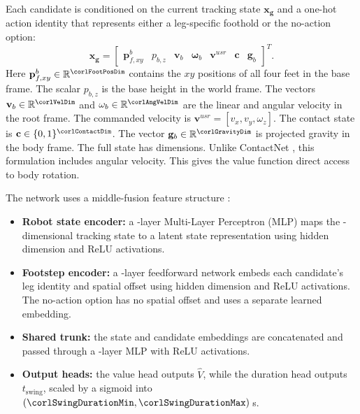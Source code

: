 Each candidate is conditioned on the current tracking state
$\mathbf{x_g}$ and a one-hot action identity that represents either a
leg-specific foothold or the no-action option:
\begin{equation}
  \mathbf{x_g} =
  \begin{bmatrix}
    \mathbf p_{f,xy}^{b} &
    p_{b,z} &
    \mathbf v_b &
    \mathbf \omega_b &
    \mathbf v^{usr} &
    \mathbf c &
    \mathbf g_b
  \end{bmatrix}^T .
  \label{eq:gaitnet-x}
\end{equation}
Here $\mathbf p_{f,xy}^{b} \in \mathbb{R}^{\corlFootPosDim}$ contains
the $xy$ positions of all four feet in the base frame. The scalar
$p_{b,z}$ is the base height in the world frame. The vectors
$\mathbf v_b \in \mathbb{R}^{\corlVelDim}$ and
$\mathbf \omega_b \in \mathbb{R}^{\corlAngVelDim}$ are the linear and
angular velocity in the root frame. The commanded velocity is
$\mathbf v^{usr} = [v_x, v_y, \omega_z]$. The contact state is
$\mathbf c \in \{0,1\}^{\corlContactDim}$. The vector
$\mathbf g_b \in \mathbb{R}^{\corlGravityDim}$ is projected gravity in
the body frame. The full state has \corlStateDim{} dimensions. Unlike
ContactNet \cite{bratta_contactnet_2024}, this formulation includes
angular velocity. This gives the value function direct access to body
rotation.

The network uses a middle-fusion feature structure \cite{feng2021deep}:
\begin{itemize}
  \item \textbf{Robot state encoder:} a
    \numberstringnum{\corlStateEncoderLayers}-layer Multi-Layer
    Perceptron (MLP) maps the \corlStateDim-dimensional tracking state
    to a latent state representation using hidden dimension
    \corlStateEncoderHidden{} and ReLU activations.
  \item \textbf{Footstep encoder:} a
    \numberstringnum{\corlFootstepEncoderLayers}-layer feedforward
    network embeds each candidate's leg identity and spatial offset
    using hidden dimension \corlFootstepEncoderHidden{} and ReLU
    activations. The no-action option has no spatial offset and uses a
    separate learned embedding.
  \item \textbf{Shared trunk:} the state and candidate embeddings are
    concatenated and passed through a
    \numberstringnum{\corlTrunkLayers}-layer MLP with ReLU
    activations.
  \item \textbf{Output heads:} the value head outputs $\hat{V}$, while
    the duration head outputs $t_{\text{swing}}$, scaled by a sigmoid
    into $(\corlSwingDurationMin, \corlSwingDurationMax)$\,s.
\end{itemize}


